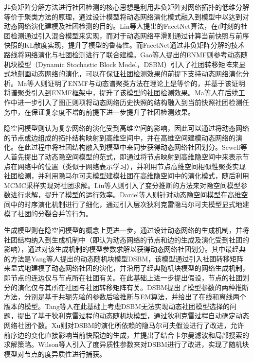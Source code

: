 非负矩阵分解方法进行社团检测的核心思想是利用非负矩阵对网络拓扑的低维分解等价于聚类方法的原理，通过设计模型将动态网络演化模式融入到模型中以达到对动态网络演化建模及社团检测的目的。Lin等人\cite{lin2009analyzing}提出的FacetNet算法，在$t$时刻的社团检测通过引入混合模型来实现，而对于动态网络平滑则通过计算当前快照与前序快照的KL散度实现，提升了模型的鲁棒性。而FacetNet通过非负矩阵分解的技术路线将网络演化与社团检测进行了联合建模。Gao等人\cite{gao2017dynamic}提出的ENMF则参考动态随机块模型（Dynamic Stochastic Block Model，DSBM）\cite{yang2011detecting}引入了社团转移矩阵来显式地刻画动态网络的演化，可以在保证社团检测效果的前提下支持动态网络演化分析。Ma等人\cite{ma2017evolutionary}则证明了ENMF与动态谱聚类方法在理论上是等价的，并基于该证明将谱聚类引入到ENMF框架中，提升了该模型的社团检测效果。Ma等人\cite{ma2019detecting}在后续工作中进一步引入了图正则项将动态网络历史快照的结构融入到当前快照社团检测任务中，在保证复杂度不增的前提下进一步提升了社团检测效果。

隐空间模型则认为复杂网络的演化受到高维空间的影响，因此可以通过将动态网络的节点或边组成的拓扑结构映射到高维空间中，并在高维空间建模动态网络的演化。在此过程中将社团结构融入到模型中来同步获得动态网络社团划分。Sewell等人\cite{sewell2015latent}首先提出了动态隐空间模型的范式，即通过将节点映射到高维隐空间中来表示节点在网络中的位置（类似于网络表示学习），并利用节点高维空间相似性聚类实现社团检测，并利用隐马尔可夫模型建模社团在高维隐空间中的演化模式，随后利用MCMC采样实现对社团求解。Liu等人\cite{liu2022variational}则引入了变分推断的方法来对隐空间模型参数进行求解，提升了模型的运行效率。Daniel等人\cite{daniel2023bayesian}则针对动态隐空间模型在高维空间中的时序演化机制进行了细化，通过引入层次狄利克雷隐马尔可夫模型显式地建模了社团的分裂合并等行为。

生成模型则在隐空间模型的概念上更进一步，通过设计动态网络的生成机制，并将社团结构纳入到生成机制中（即认为动态网络的节点和边的生成及演化受到社团的影响），通过对该生成机制的模型参数求解以获得动态网络社团划分。其中最经典的方法是Yang等人\cite{yang2011detecting}提出的动态随机块模型DSBM，该模型通过引入社团转移矩阵来显式地建模了动态网络社团的演化，并沿用了经典随机块模型的网络生成机制，即节点的连边仅与节点所在社团有关。在此基础上进一步提出假设，节点的社团划分的演化仅与其所在社团与社团转移矩阵有关。DSBM提出了模型参数的两种推断方法，分别是基于共轭先验的参数后验推断与EM算法，并给出了在线和离线两个版本的模型。Tang等人\cite{tang2014detecting}在此基础上考虑DSBM无法实现动态社团模型选择的问题，提出了基于狄利克雷过程的动态随机块模型，通过狄利克雷过程自动确定动态网络社团个数。Xu\cite{xu2015stochastic}则对DSBM的演化所依赖的隐马尔可夫假设进行了改进，允许前序边的变化直接影响当前快照边的生成，并提出了结合卡尔曼滤波和局部搜索的求解策略。Wilson等人\cite{wilson2019modeling}引入了度异质性参数来对DSBM进行了改进，实现了随机块模型对节点的度异质性进行捕获。

